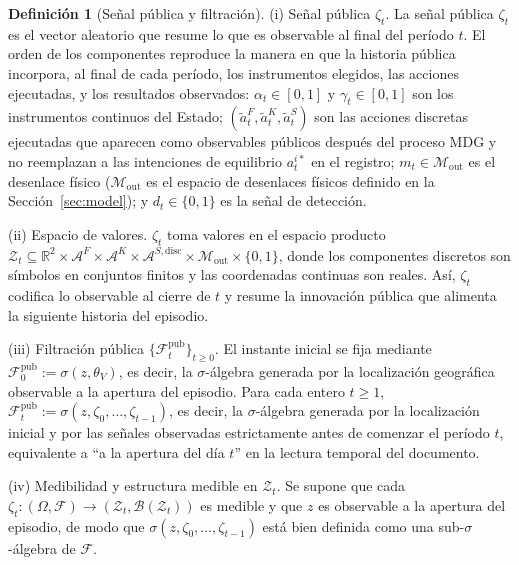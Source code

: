 \documentclass[review,authoryear,12pt]{elsarticle}
\theoremstyle{plain}
\theoremstyle{definition}
\newtheorem{definition}[theorem]{Definición}
\newcommand{\1}{\mathbf{1}}
\begin{document}
\begin{definition}[Señal pública y filtración]
\label{def:zeta-filtration}
\noindent\textup{(i)} Señal pública $\zeta_t$.\quad
La señal pública $\zeta_t$ es el vector aleatorio que resume lo que es observable al final del período $t$. El orden de los componentes reproduce la manera en que la historia pública incorpora, al final de cada período, los instrumentos elegidos, las acciones ejecutadas, y los resultados observados:
 $\alpha_t\in[0,1]$ y $\gamma_t\in[0,1]$ son los instrumentos continuos del Estado; $(\tilde{a}_t^F,\tilde{a}_t^K,\tilde{a}_t^S)$ son las acciones discretas ejecutadas que aparecen como observables públicos después del proceso MDG y no reemplazan a las intenciones de equilibrio $a_t^{i\ast}$ en el registro; $m_t\in\mathcal{M}_{\mathrm{out}}$ es el desenlace físico \textup{(}$\mathcal{M}_{\mathrm{out}}$ es el espacio de desenlaces físicos definido en la Sección~\ref{sec:model}\textup{)}; y $d_t\in\{0,1\}$ es la señal de detección.

\medskip
\noindent\textup{(ii)} Espacio de valores.\quad
$\zeta_t$ toma valores en el espacio producto $\mathcal{Z}_t \subseteq \mathbb{R}^2 \times \mathcal{A}^F \times \mathcal{A}^K \times \mathcal{A}^{S,\mathrm{disc}} \times \mathcal{M}_{\mathrm{out}} \times \{0,1\}$, donde los componentes discretos son símbolos en conjuntos finitos y las coordenadas continuas son reales. Así, $\zeta_t$ codifica lo observable al cierre de $t$ y resume la innovación pública que alimenta la siguiente historia del episodio.

\medskip
\noindent\textup{(iii)} Filtración pública $\{\mathcal{F}_t^{\mathrm{pub}}\}_{t\ge 0}$.\quad
El instante inicial se fija mediante $\mathcal{F}_0^{\mathrm{pub}}:=\sigma(z, \theta_V)$, es decir, la $\sigma$-álgebra generada por la localización geográfica observable a la apertura del episodio. Para cada entero $t\ge 1$, $\mathcal{F}_t^{\mathrm{pub}}:=\sigma(z,\zeta_0,\ldots,\zeta_{t-1})$, es decir, la $\sigma$-álgebra generada por la localización inicial y por las señales observadas estrictamente antes de comenzar el período $t$, equivalente a ``a la apertura del día $t$'' en la lectura temporal del documento.

\smallskip
\noindent\textup{(iv)} Medibilidad y estructura medible en $\mathcal{Z}_t$.\quad
Se supone que cada $\zeta_t:(\Omega,\mathcal{F})\to(\mathcal{Z}_t,\mathcal{B}(\mathcal{Z}_t))$ es medible y que $z$ es observable a la apertura del episodio, de modo que $\sigma(z,\zeta_0,\ldots,\zeta_{t-1})$ está bien definida como una sub-$\sigma$-álgebra de $\mathcal{F}$.
\end{definition}
\end{document}
